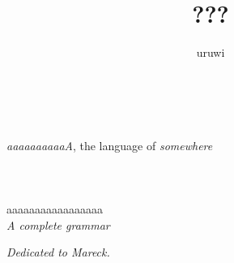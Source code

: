 \documentclass{book}
\title{???}
\author{uruwi}
\newcommand{\lname}{aaaaaaaaaaA}
\begin{document}
\pagecolor{GreenYellow!25}

\begin{titlepage}
    \makeatletter
    \begin{center}
        {\color{Orchid} \hprule \vspace{1.5ex} \\}
        {\Huge \kardinal \textcolor{Plum}{\@title}\\}
        {\large \textit{\lname}, the language of \textit{somewhere} \\}
        {\color{Orchid} \hprule \vspace{1.5ex} \\}
        \vspace{1.5cm}
        {\Large\bfseries \@author}\\[5pt]
        \vspace{2cm}
         \\
        {aaaaaaaaaaaaaaaaa} \\[5pt]
        \emph{A complete grammar}\\[2cm]
        \vfill
        \vfill
        {\@date}
    \end{center}
    \makeatother
\end{titlepage}

\pagecolor{GreenYellow!15}

\begin{center}
    \textit{Dedicated to Mareck.}
\end{center}
\end{document}
